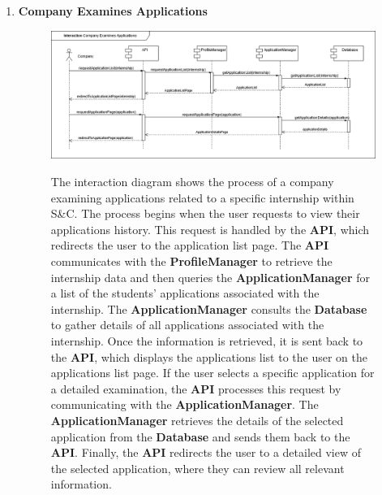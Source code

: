 \begin{enumerate}
    \newpage
    \item \textbf{Company Examines Applications}
    \begin{figure}[h!]
            \centering  \includegraphics[width=1\textwidth]{DD/Images/Interactions/INT13_CompanyExaminesApplications.drawio.png}
            \label{fig:ComponentViewDiagram}
            \caption*{The interaction diagram shows the process of a company examining applications related to a specific internship within S\&C. The process begins when the user requests to view their applications history. This request is handled by the \textbf{API}, which redirects the user to the application list page. The \textbf{API} communicates with the \textbf{ProfileManager} to retrieve the internship data and then queries the \textbf{ApplicationManager} for a list of the students’ applications associated with the internship.
            The \textbf{ApplicationManager} consults the \textbf{Database} to gather details of all applications associated with the internship. 
            Once the information is retrieved, it is sent back to the \textbf{API}, which displays the applications list to the user on the applications list page.
            If the user selects a specific application for a detailed examination, the \textbf{API} processes this request by communicating with the \textbf{ApplicationManager}. The \textbf{ApplicationManager} retrieves the details of the selected application from the \textbf{Database} and sends them back to the \textbf{API}. Finally, the \textbf{API} redirects the user to a detailed view of the selected application, where they can review all relevant information.
            }
    \end{figure}


\end{enumerate}
